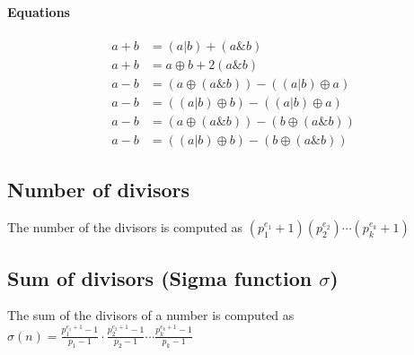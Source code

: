 \documentclass[a4paper,10pt,twocolumn, titlepage]{article}
\begin{document}
\paragraph{Equations}
$$
\begin{array}{rl}
 a+b &= (a|b)+(a \& b) \\
 a+b &= a\oplus b + 2(a \& b) \\
 a-b &= (a \oplus(a \& b))-((a|b)\oplus a) \\
 a-b &= ((a|b)\oplus b) - ((a|b)\oplus a) \\
 a-b &= (a \oplus (a\& b)) - (b \oplus (a \& b)) \\
 a-b &= ((a|b)\oplus b) - (b\oplus (a\&b))
\end{array}
$$

\subsection{Number of divisors}

The number of the divisors is computed as $(p_1^{e_1} + 1)(p_2^{e_2})\cdots(p_k^{e_k}+1)$



\subsection{Sum of divisors (Sigma function $\sigma$)}
The sum of the divisors of a number is computed as $\sigma(n)=\frac{p_1^{e_1+1}-1}{p_1-1}\cdot\frac{p_2^{e_2+1}-1}{p_2-1}\cdots\frac{p_k^{e_k+1}-1}{p_k-1}$


\end{document}
